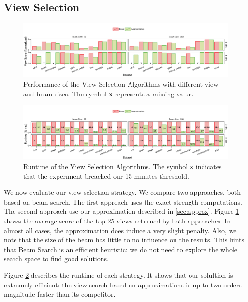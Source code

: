 \subsection{View Selection}

\begin{figure}[t!]
\centering
\includegraphics[width=2\columnwidth]{plots/column-select-score}
\caption{Performance of the View Selection Algorithms with different view and
beam sizes. The symbol \texttt{x} represents a missing value.}
\label{pic:column-select-score}
\end{figure}
 
\begin{figure}[t!]
\centering
\includegraphics[width=2\columnwidth]{plots/column-select-time}
\caption{Runtime of the View Selection Algorithms. The symbol \texttt{x}
indicates that the experiment breached our 15 minutes threshold.} 
\label{pic:column-select-time}
\end{figure}


We now evaluate our view selection strategy. We compare two approaches, both
based on beam search. The first approach uses the exact strength computations.
The second approach use our approximation described in \ref{sec:approx}. Figure 
\ref{pic:column-select-score} shows the average score of the top 25 views
returned by both approaches. In almost all cases, the approximation does induce a
very slight penalty. Also, we note that the size of the beam has little to no influence
on the results. This hints that Beam Search is an efficient heuristic: we do
not need to explore the whole search space to find good solutions.

Figure \ref{pic:column-select-time} describes the runtime of each strategy. It
shows that our solultion is extremely efficient: the view search based on
approximations is up to two orders magnitude faster than its competitor.


